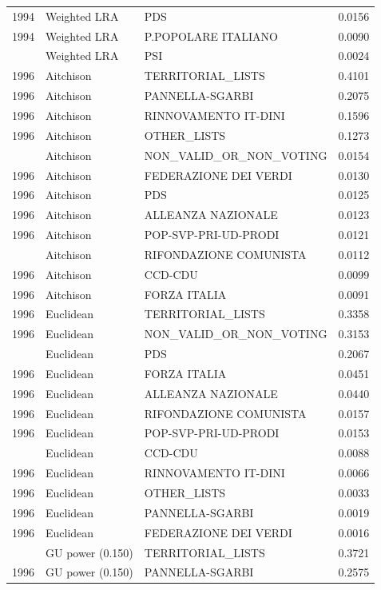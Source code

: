 \begin{longtable}[t]{rllr}
1994 & Weighted LRA & PDS & 0.0156\\
1994 & Weighted LRA & P.POPOLARE ITALIANO & 0.0090\\
\addlinespace
1994 & Weighted LRA & PSI & 0.0024\\
1996 & Aitchison & TERRITORIAL\_LISTS & 0.4101\\
1996 & Aitchison & PANNELLA-SGARBI & 0.2075\\
1996 & Aitchison & RINNOVAMENTO IT-DINI & 0.1596\\
1996 & Aitchison & OTHER\_LISTS & 0.1273\\
\addlinespace
1996 & Aitchison & NON\_VALID\_OR\_NON\_VOTING & 0.0154\\
1996 & Aitchison & FEDERAZIONE DEI VERDI & 0.0130\\
1996 & Aitchison & PDS & 0.0125\\
1996 & Aitchison & ALLEANZA NAZIONALE & 0.0123\\
1996 & Aitchison & POP-SVP-PRI-UD-PRODI & 0.0121\\
\addlinespace
1996 & Aitchison & RIFONDAZIONE COMUNISTA & 0.0112\\
1996 & Aitchison & CCD-CDU & 0.0099\\
1996 & Aitchison & FORZA ITALIA & 0.0091\\
1996 & Euclidean & TERRITORIAL\_LISTS & 0.3358\\
1996 & Euclidean & NON\_VALID\_OR\_NON\_VOTING & 0.3153\\
\addlinespace
1996 & Euclidean & PDS & 0.2067\\
1996 & Euclidean & FORZA ITALIA & 0.0451\\
1996 & Euclidean & ALLEANZA NAZIONALE & 0.0440\\
1996 & Euclidean & RIFONDAZIONE COMUNISTA & 0.0157\\
1996 & Euclidean & POP-SVP-PRI-UD-PRODI & 0.0153\\
\addlinespace
1996 & Euclidean & CCD-CDU & 0.0088\\
1996 & Euclidean & RINNOVAMENTO IT-DINI & 0.0066\\
1996 & Euclidean & OTHER\_LISTS & 0.0033\\
1996 & Euclidean & PANNELLA-SGARBI & 0.0019\\
1996 & Euclidean & FEDERAZIONE DEI VERDI & 0.0016\\
\addlinespace
1996 & GU power (0.150) & TERRITORIAL\_LISTS & 0.3721\\
1996 & GU power (0.150) & PANNELLA-SGARBI & 0.2575\\

\end{longtable}
